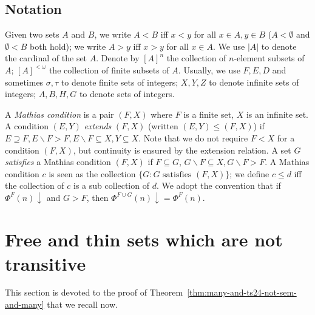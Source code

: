 \documentclass{amsart}
\theoremstyle{definition}
\theoremstyle{remark}
\numberwithin{equation}{section}
\theoremstyle{noparens}
\renewcommand{\setminus}{\smallsetminus}
\begin{document}
\subsection{Notation}



Given two sets $A$ and $B$, we write $A < B$ iff $x<y$ for all $x\in A,y\in B$ ($A < \emptyset$ and $\emptyset < B$
both hold); we write $A>y$ iff $x>y$ for all $x\in A$.
We use $|A|$ to  denote the cardinal of the set $A$.
Denote by $[A]^n$ the collection of $n$-element subsets of $A$;
$[A]^{<\omega}$ the collection of finite subsets of $A$.
Usually, we use $F,E,D$ and sometimes $\sigma,\tau$ to denote finite sets of integers;
$X,Y,Z$ to denote infinite sets of integers;
$A,B,H,G$ to denote sets of integers.





A \emph{Mathias condition} is a pair $(F, X)$
where $F$ is a finite set, $X$ is an infinite set.
 A condition $(E, Y)$ \emph{extends } $(F, X)$ (written $(E, Y) \leq (F,X)$)
if $E\supseteq F, E\setminus F>F, E\setminus F\subseteq X, Y\subseteq X$. Note that we do not require $F < X$ for a condition $(F, X)$, but continuity is ensured by the extension relation.
A set $G$ \emph{satisfies} a Mathias condition $(F, X)$
if $F \subseteq G$, $G \setminus F \subseteq X, G\setminus F>F$.
A Mathias condition $c$ is seen as the collection $\{G:G\text{ satisfies }(F,X)\}$;
we define $c\leq d$ iff the collection of $c$ is a sub collection of   $d$.
We adopt the convention that if $\Phi^F(n)\downarrow$ and $G>F$,
then $\Phi^{F\cup G}(n)\downarrow =\Phi^F(n)$.



\section{Free and thin sets which are not transitive}\label{sect:fs-ts-sem}



This section is devoted to the proof of Theorem~\ref{thm:many-and-ts24-not-sem-and-many} that we recall now.
\end{document}
